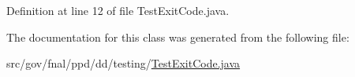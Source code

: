 Definition at line 12 of file Test\-Exit\-Code.\-java.



The documentation for this class was generated from the following file\-:\begin{DoxyCompactItemize}
\item 
src/gov/fnal/ppd/dd/testing/\hyperlink{TestExitCode_8java}{Test\-Exit\-Code.\-java}\end{DoxyCompactItemize}
